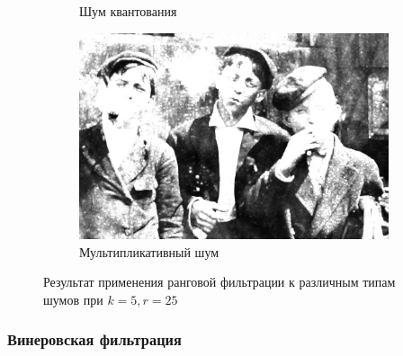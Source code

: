 \begin{figure}[ht]
\begin{subfigure}[b]{0.5\linewidth}
      \caption{Шум квантования} 
      \label{rang_5_25:e}
    \end{subfigure}%
    \begin{subfigure}[b]{0.5\linewidth}
        \centering
        \includegraphics[width=0.95\linewidth]{../Rang_Filter/Rang_Speckle_noise_(k=5,r=25).jpg} 
        \caption{Мультипликативный шум} 
        \label{rang_5_25:f} 
    \end{subfigure} 
    \caption{Результат применения ранговой фильтрации к различным типам шумов при $k = 5, r = 25$}
    \label{img:rang_5_25} 
\end{figure}
\FloatBarrier

\subsubsection{Винеровская фильтрация}

